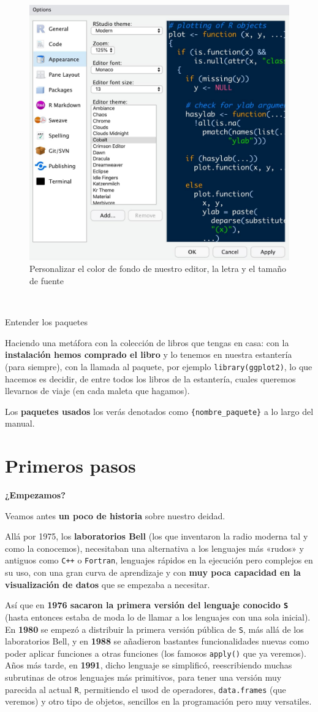 \documentclass[11pt,]{book}
\begin{document}
\begin{figure}

{\centering \includegraphics[width=0.4\linewidth,height=0.4\textheight]{./img/menu_2} 

}

\caption{Personalizar el color de fondo de nuestro editor, la letra y el tamaño de fuente}\label{fig:menu-2}
\end{figure}

~

Entender los paquetes

Haciendo una metáfora con la colección de libros que tengas en casa: con la \textbf{instalación hemos comprado el libro} y lo tenemos en nuestra estantería (para siempre), con la llamada al paquete, por ejemplo \texttt{library(ggplot2)}, lo que hacemos es decidir, de entre todos los libros de la estantería, cuales queremos llevarnos de viaje (en cada maleta que hagamos).

Los \textbf{paquetes usados} los verás denotados como \texttt{\{nombre\_paquete\}} a lo largo del manual.

\hypertarget{primeros-pasos}{%
\chapter{Primeros pasos}\label{primeros-pasos}}

\textbf{¿Empezamos?}

Veamos antes \textbf{un poco de historia} sobre nuestro deidad.

Allá por 1975, los \textbf{laboratorios Bell} (los que inventaron la radio moderna tal y como la conocemos), necesitaban una alternativa a los lenguajes más «rudos» y antiguos como \texttt{C++} o \texttt{Fortran}, lenguajes rápidos en la ejecución pero complejos en su uso, con una gran curva de aprendizaje y con \textbf{muy poca capacidad en la visualización de datos} que se empezaba a necesitar.

Así que en \textbf{1976 sacaron la primera versión del lenguaje conocido \texttt{S}} (hasta entonces estaba de moda lo de llamar a los lenguajes con una sola inicial). En \textbf{1980} se empezó a distribuir la primera versión pública de \texttt{S}, más allá de los laboratorios Bell, y en \textbf{1988} se añadieron bastantes funcionalidades nuevas como poder aplicar funciones a otras funciones (los famosos \texttt{apply()} que ya veremos). Años más tarde, en \textbf{1991}, dicho lenguaje se simplificó, reescribiendo muchas subrutinas de otros lenguajes más primitivos, para tener una versión muy parecida al actual \texttt{R}, permitiendo el usod de operadores, \texttt{data.frames} (que veremos) y otro tipo de objetos, sencillos en la programación pero muy versatiles.
\end{document}
